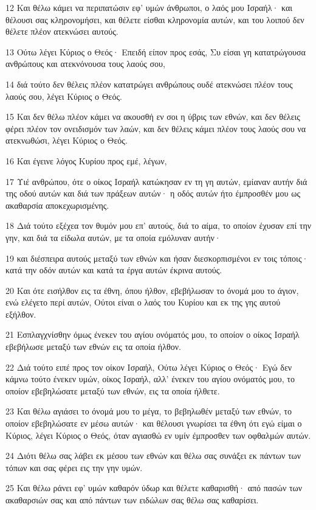 \par 12 Και θέλω κάμει να περιπατώσιν εφ' υμών άνθρωποι, ο λαός μου Ισραήλ· και θέλουσι σας κληρονομήσει, και θέλετε είσθαι κληρονομία αυτών, και του λοιπού δεν θέλετε πλέον ατεκνώσει αυτούς.
\par 13 Ούτω λέγει Κύριος ο Θεός· Επειδή είπον προς εσάς, Συ είσαι γη κατατρώγουσα ανθρώπους και ατεκνόνουσα τους λαούς σου,
\par 14 διά τούτο δεν θέλεις πλέον κατατρώγει ανθρώπους ουδέ ατεκνώσει πλέον τους λαούς σου, λέγει Κύριος ο Θεός.
\par 15 Και δεν θέλω πλέον κάμει να ακουσθή εν σοι η ύβρις των εθνών, και δεν θέλεις φέρει πλέον τον ονειδισμόν των λαών, και δεν θέλεις κάμει πλέον τους λαούς σου να ατεκνωθώσι, λέγει Κύριος ο Θεός.
\par 16 Και έγεινε λόγος Κυρίου προς εμέ, λέγων,
\par 17 Υιέ ανθρώπου, ότε ο οίκος Ισραήλ κατώκησαν εν τη γη αυτών, εμίαναν αυτήν διά της οδού αυτών και διά των πράξεων αυτών· η οδός αυτών ήτο έμπροσθέν μου ως ακαθαρσία αποκεχωρισμένης.
\par 18 Διά τούτο εξέχεα τον θυμόν μου επ' αυτούς, διά το αίμα, το οποίον έχυσαν επί την γην, και διά τα είδωλα αυτών, με τα οποία εμόλυναν αυτήν·
\par 19 και διέσπειρα αυτούς μεταξύ των εθνών και ήσαν διεσκορπισμένοι εν τοις τόποις· κατά την οδόν αυτών και κατά τα έργα αυτών έκρινα αυτούς.
\par 20 Και ότε εισήλθον εις τα έθνη, όπου ήλθον, εβεβήλωσαν το όνομά μου το άγιον, ενώ ελέγετο περί αυτών, Ούτοι είναι ο λαός του Κυρίου και εκ της γης αυτού εξήλθον.
\par 21 Εσπλαγχνίσθην όμως ένεκεν του αγίου ονόματός μου, το οποίον ο οίκος Ισραήλ εβεβήλωσε μεταξύ των εθνών εις τα οποία ήλθον.
\par 22 Διά τούτο ειπέ προς τον οίκον Ισραήλ, Ούτω λέγει Κύριος ο Θεός· Εγώ δεν κάμνω τούτο ένεκεν υμών, οίκος Ισραήλ, αλλ' ένεκεν του αγίου ονόματός μου, το οποίον εβεβηλώσατε μεταξύ των εθνών, εις τα οποία ήλθετε.
\par 23 Και θέλω αγιάσει το όνομά μου το μέγα, το βεβηλωθέν μεταξύ των εθνών, το οποίον εβεβηλώσατε εν μέσω αυτών· και θέλουσι γνωρίσει τα έθνη ότι εγώ είμαι ο Κύριος, λέγει Κύριος ο Θεός, όταν αγιασθώ εν υμίν έμπροσθεν των οφθαλμών αυτών.
\par 24 Διότι θέλω σας λάβει εκ μέσου των εθνών και θέλω σας συνάξει εκ πάντων των τόπων και σας φέρει εις την γην υμών.
\par 25 Και θέλω ράνει εφ' υμών καθαρόν ύδωρ και θέλετε καθαρισθή· από πασών των ακαθαρσιών σας και από πάντων των ειδώλων σας θέλω σας καθαρίσει.
